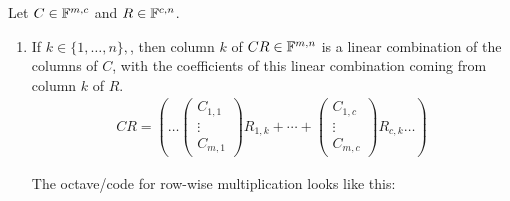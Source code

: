 \begin{thm}
  Let $C\in\mathbb{F}^{m,c}$ and $R\in\mathbb{F}^{c,n}$.
  \begin{enumerate}
    \item If $k \in \{1,\ldots,n\},$, then column $k$ of $CR\in \mathbb{F}^{m,n}$ is a linear combination of the columns of $C$, with the coefficients of this linear combination coming from column $k$ of $R$.
    \begin{equation}
      \begin{aligned}
        CR = 
          \left ( \ldots \left(
            \begin{matrix}C_{1,1} 
              \\ \vdots \\ C_{m,1} 
            \end{matrix}
          \right) R_{1,k} 
          + \cdots + 
          \left(
            \begin{matrix}C_{1,c}
              \\ \vdots \\ C_{m,c} 
            \end{matrix}\right) R_{c,k}
          \ldots
        \right)
      \end{aligned}
    \end{equation}
    
  The octave\-/code for row-wise multiplication looks like this:
  
  \begin{center}    
    \begin{minipage}{\linewidth}
      \addtolength{\linewidth}{-7em}  
      
      \addtolength{\linewidth}{+7em}
    \end{minipage}
  \end{center}
  

\end{enumerate}
\end{thm}
